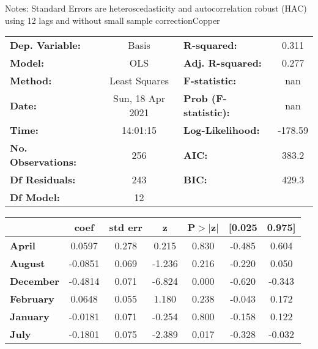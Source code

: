 Notes: \newline
 [1] Standard Errors are heteroscedasticity and autocorrelation robust (HAC) using 12 lags and without small sample correctionCopper\begin{center}
\begin{tabular}{lclc}
\toprule
\textbf{Dep. Variable:}    &      Basis       & \textbf{  R-squared:         } &     0.311   \\
\textbf{Model:}            &       OLS        & \textbf{  Adj. R-squared:    } &     0.277   \\
\textbf{Method:}           &  Least Squares   & \textbf{  F-statistic:       } &       nan   \\
\textbf{Date:}             & Sun, 18 Apr 2021 & \textbf{  Prob (F-statistic):} &      nan    \\
\textbf{Time:}             &     14:01:15     & \textbf{  Log-Likelihood:    } &   -178.59   \\
\textbf{No. Observations:} &         256      & \textbf{  AIC:               } &     383.2   \\
\textbf{Df Residuals:}     &         243      & \textbf{  BIC:               } &     429.3   \\
\textbf{Df Model:}         &          12      & \textbf{                     } &             \\
\bottomrule
\end{tabular}
\begin{tabular}{lcccccc}
                   & \textbf{coef} & \textbf{std err} & \textbf{z} & \textbf{P$> |$z$|$} & \textbf{[0.025} & \textbf{0.975]}  \\
\midrule
\textbf{April}     &       0.0597  &        0.278     &     0.215  &         0.830        &       -0.485    &        0.604     \\
\textbf{August}    &      -0.0851  &        0.069     &    -1.236  &         0.216        &       -0.220    &        0.050     \\
\textbf{December}  &      -0.4814  &        0.071     &    -6.824  &         0.000        &       -0.620    &       -0.343     \\
\textbf{February}  &       0.0648  &        0.055     &     1.180  &         0.238        &       -0.043    &        0.172     \\
\textbf{January}   &      -0.0181  &        0.071     &    -0.254  &         0.800        &       -0.158    &        0.122     \\
\textbf{July}      &      -0.1801  &        0.075     &    -2.389  &         0.017        &       -0.328    &       -0.032     \\

\end{tabular}
\end{center}
